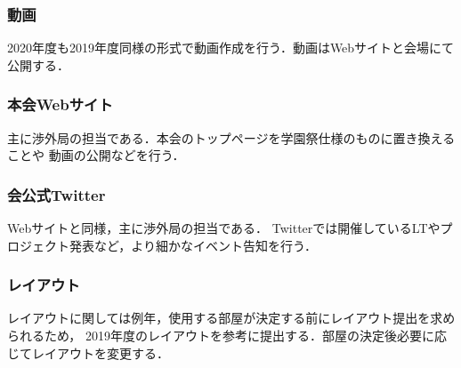 \subsubsection*{動画}
2020年度も2019年度同様の形式で動画作成を行う．動画はWebサイトと会場にて公開する．


\subsubsection*{本会Webサイト}
主に渉外局の担当である．本会のトップページを学園祭仕様のものに置き換えることや
動画の公開などを行う．

\subsubsection*{会公式Twitter}
Webサイトと同様，主に渉外局の担当である．
Twitterでは開催しているLTやプロジェクト発表など，より細かなイベント告知を行う．

\subsubsection*{レイアウト}
レイアウトに関しては例年，使用する部屋が決定する前にレイアウト提出を求められるため，
2019年度のレイアウトを参考に提出する．部屋の決定後必要に応じてレイアウトを変更する．

